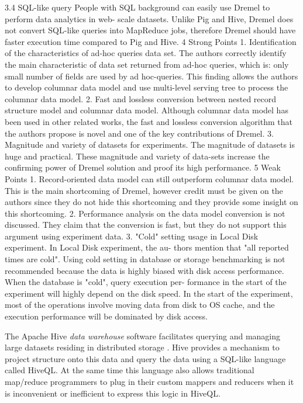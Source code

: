 \documentclass[twocolumn]{article}
\begin{document}
3.4 SQL-like query
People with SQL background can easily use Dremel to perform data analytics in web- scale datasets. Unlike Pig and Hive, Dremel does not convert SQL-like queries into MapReduce jobs, therefore Dremel should have faster execution time compared to Pig and Hive.
4 Strong Points
1. Identification of the characteristics of ad-hoc queries data set.
The authors correctly identify the main characteristic of data set returned from ad-hoc queries, which is: only small number of fields are used by ad hoc-queries. This finding allows the authors to develop columnar data model and use multi-level serving tree to process the columnar data model.
2. Fast and lossless conversion between nested record structure model and columnar data model.
Although columnar data model has been used in other related works, the fast and lossless conversion algorithm that the authors propose is novel and one of the key contributions of Dremel.
3. Magnitude and variety of datasets for experiments.
The magnitude of datasets is huge and practical. These magnitude and variety of data-sets increase the confirming power of Dremel solution and proof its high performance.
5 Weak Points
1. Record-oriented data model can still outperform columnar data model. This is the main shortcoming of Dremel, however credit must be given on the authors since they do not hide this shortcoming and they provide some insight on this shortcoming.
2. Performance analysis on the data model conversion is not discussed. They claim that the conversion is fast, but they do not support this argument using experiment data.
3. "Cold" setting usage in Local Disk experiment. In Local Disk experiment, the au- thors mention that "all reported times are cold". Using cold setting in database or storage benchmarking is not recommended because the data is highly biased with disk access performance. When the database is "cold", query execution per- formance in the start of the experiment will highly depend on the disk speed. In the start of the experiment, most of the operations involve moving data from disk to OS cache, and the execution performance will be dominated by disk access.







The Apache Hive \textit{data warehouse} software facilitates querying and managing large datasets residing in distributed storage \cite{Thusoo:2010}. Hive provides a mechanism to project structure onto this data and query the data using a SQL-like language called HiveQL. At the same time this language also allows traditional map/reduce programmers to plug in their custom mappers and reducers when it is inconvenient or inefficient to express this logic in HiveQL.\\
\end{document}
